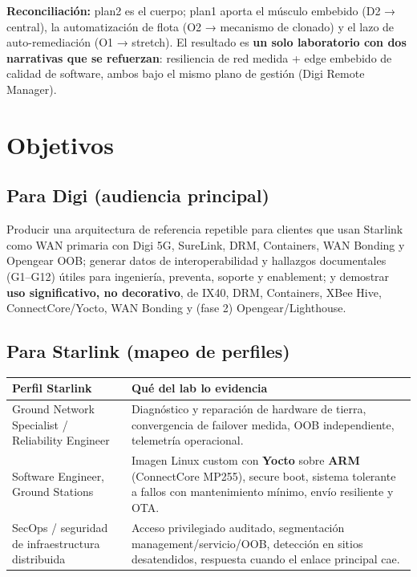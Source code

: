 \documentclass[11pt,a4paper]{article}
\newcommand{\hcell}[1]{\textbf{#1}}
\begin{document}
\noindent\textbf{Reconciliación:} plan2 es el cuerpo; plan1 aporta el músculo embebido (D2 → central), la automatización de flota (O2 → mecanismo de clonado) y el lazo de auto-remediación (O1 → stretch). El resultado es \textbf{un solo laboratorio con dos narrativas que se refuerzan}: resiliencia de red medida + edge embebido de calidad de software, ambos bajo el mismo plano de gestión (Digi Remote Manager).

\section{Objetivos}

\subsection{Para Digi (audiencia principal)}
Producir una arquitectura de referencia repetible para clientes que usan Starlink como WAN primaria con Digi 5G, SureLink, DRM, Containers, WAN Bonding y Opengear OOB; generar datos de interoperabilidad y hallazgos documentales (G1–G12) útiles para ingeniería, preventa, soporte y enablement; y demostrar \textbf{uso significativo, no decorativo}, de IX40, DRM, Containers, XBee Hive, ConnectCore/Yocto, WAN Bonding y (fase 2) Opengear/Lighthouse.

\subsection{Para Starlink (mapeo de perfiles)}
\begin{center}
\small
\begin{tabularx}{\textwidth}{@{}p{4.3cm} X@{}}
\toprule
\hcell{Perfil Starlink} & \hcell{Qué del lab lo evidencia} \\
\midrule
Ground Network Specialist / Reliability Engineer & Diagnóstico y reparación de hardware de tierra, convergencia de failover medida, OOB independiente, telemetría operacional. \\
\addlinespace
Software Engineer, Ground Stations & Imagen Linux custom con \textbf{Yocto} sobre \textbf{ARM} (ConnectCore MP255), secure boot, sistema tolerante a fallos con mantenimiento mínimo, envío resiliente y OTA. \\
\addlinespace
SecOps / seguridad de infraestructura distribuida & Acceso privilegiado auditado, segmentación management/servicio/OOB, detección en sitios desatendidos, respuesta cuando el enlace principal cae. \\
\bottomrule
\end{tabularx}
\end{center}
\end{document}
